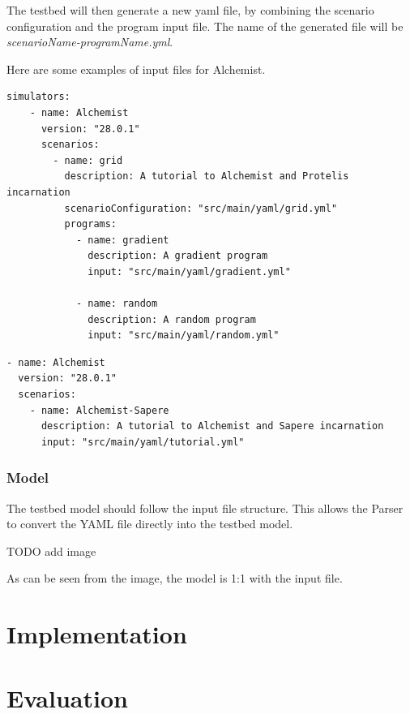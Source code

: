 \documentclass[12pt,a4paper,openright,twoside]{book}
\begin{document}
The testbed will then generate a new yaml file, by combining the scenario configuration and the program input file. 
The name of the generated file will be \textit{scenarioName-programName.yml}.

Here are some examples of input files for Alchemist.

\begin{lstlisting}[style=yaml, caption={Two programs to be tested in the same scenario}]
  simulators:
    - name: Alchemist
      version: "28.0.1"
      scenarios:
        - name: grid
          description: A tutorial to Alchemist and Protelis incarnation
          scenarioConfiguration: "src/main/yaml/grid.yml"
          programs:
            - name: gradient
              description: A gradient program
              input: "src/main/yaml/gradient.yml"
  
            - name: random
              description: A random program
              input: "src/main/yaml/random.yml"
  \end{lstlisting}

\begin{lstlisting}[style=yaml, caption={One scenario and one program. Both specified in the same input file.}]
- name: Alchemist
  version: "28.0.1"
  scenarios:
    - name: Alchemist-Sapere
      description: A tutorial to Alchemist and Sapere incarnation
      input: "src/main/yaml/tutorial.yml"
\end{lstlisting}

\subsection{Model}
The testbed model should follow the input file structure. 
This allows the Parser to convert the YAML file directly into the testbed model.

TODO add image

As can be seen from the image, the model is 1:1 with the input file.

\chapter{Implementation}

\chapter{Evaluation}
\end{document}
